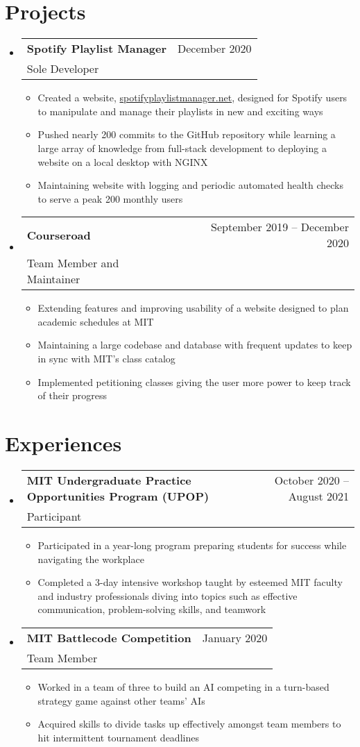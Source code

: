\documentclass[letterpaper,12pt]{article} %
\makeatletter
\newcommand{\CVItem}[1]{
  \item\small{
    {#1 \vspace{-2pt}}
  }
}
\newcommand{\CVSubheading}[4]{
  \vspace{-2pt}\item
    \begin{tabular*}{0.97\textwidth}[t]{l@{\extracolsep{\fill}}r}
      \textbf{#1} & #2 \\
      \small#3 & \small #4 \\
    \end{tabular*}\vspace{-7pt}
}
\newcommand{\CVSubHeadingListStart}{\begin{itemize}[leftmargin=0.15in, label={}]} %
\newcommand{\CVSubHeadingListEnd}{\end{itemize}}
\newcommand{\CVItemListStart}{\begin{itemize}}
\newcommand{\CVItemListEnd}{\end{itemize}\vspace{-5pt}}
\makeatother
\begin{document}
\section{Projects}
\CVSubHeadingListStart
\CVSubheading
{Spotify Playlist Manager}{December 2020}
{Sole Developer}{}
\CVItemListStart
\CVItem{Created a website, \href{www.spotifyplaylistmanaget.net}{spotifyplaylistmanager.net},
  designed for Spotify users to manipulate and manage their playlists in new and exciting ways}
\CVItem{Pushed nearly 200 commits to the GitHub repository
  while learning a large array of knowledge from full-stack development to deploying a website on a local desktop with NGINX}
\CVItem{Maintaining website with logging and periodic automated health checks to serve a peak 200 monthly users}
\CVItemListEnd
\CVSubheading
{Courseroad}{September 2019 -- December 2020}
{Team Member and Maintainer}{}
\CVItemListStart
\CVItem{Extending features and improving usability of a website designed to plan academic schedules at MIT}
\CVItem{Maintaining a large codebase and database with frequent updates to keep in sync with MIT's class catalog}
\CVItem{Implemented petitioning classes giving the user more power to keep track of their progress}
\CVItemListEnd
\CVSubHeadingListEnd
\section{Experiences}
\CVSubHeadingListStart
\CVSubheading
{MIT Undergraduate Practice Opportunities Program (UPOP)}{October 2020 -- August 2021}
{Participant}{}
\CVItemListStart
\CVItem{Participated in a year-long program preparing students for success while navigating the workplace}
\CVItem{Completed a 3-day intensive workshop taught by esteemed MIT faculty and industry professionals
  diving into topics such as effective communication, problem-solving skills, and teamwork}
\CVItemListEnd
\CVSubheading
{MIT Battlecode Competition}{January 2020}
{Team Member}{}
\CVItemListStart
\CVItem{Worked in a team of three to build an AI competing in a turn-based strategy game against other teams' AIs}
\CVItem{Acquired skills to divide tasks up effectively amongst team members to hit intermittent tournament deadlines}
\CVItemListEnd
\CVSubHeadingListEnd

\end{document}
